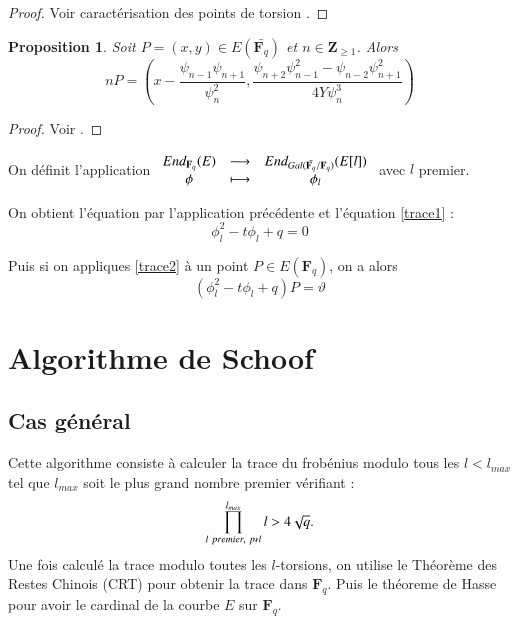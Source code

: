\documentclass{article}%
\theoremstyle{plain}
\theoremstyle{definition}
\theoremstyle{plain}
\newtheorem{proposition}{Proposition}[section]
\theoremstyle{plain}
\theoremstyle{remark}
\newcommand\fq{\mathbf{F}_{q}}
\begin{document}
\begin{proof}
Voir caractérisation des points de torsion \cite{ref4}. 
\end{proof}

\begin{proposition}
Soit $P=(x,y)\in E(\bar{\fq})$ et $n\in\mathbf{Z}_{\geq 1}$. Alors 
\begin{equation}
nP = \left(x - \dfrac{\psi_{n - 1}\psi_{n + 1}}{\psi_{n}^{2}},\dfrac{\psi_{n + 2}\psi_{n - 1}^{2} - \psi_{n - 2}\psi_{n + 1}^{2}}{4Y\psi_{n}^{3}}\right)
\label{np2}
\end{equation}
\end{proposition}

\begin{proof}
Voir \cite{ref6}.
\end{proof}
  
On définit l'application $
\begin{array}{cl cl}
End_{\fq}(E)&\longrightarrow&End_{Gal(\bar{\fq}/\fq)}(E[l])\\
\phi&\longmapsto&\phi_{l}
\end{array}
$ avec $l$ premier.

On obtient l'équation par l'application précédente et l'équation \eqref{trace1} :
\begin{equation}
\phi_{l}^{2} - t\phi_{l} + q = 0
\label{trace2}
\end{equation}

Puis si on appliques \eqref{trace2} à un point $P\in E(\fq)$, on a alors 
\begin{equation}
(\phi_{l}^{2} - t\phi_{l} + q)P = \vartheta
\label{trace3}
\end{equation}


\section{Algorithme de Schoof}
\subsection{Cas général}

Cette algorithme consiste à calculer la trace du frobénius modulo tous les $l<l_{max}$ tel que $l_{max}$ soit le plus grand nombre premier vérifiant :\begin{equation} 
\prod_{l\ premier,\ p\nshortmid l}^{l_{max}}l > 4\sqrt{q}.
\label{primorielle}
\end{equation}
Une fois calculé la trace modulo toutes les $l$-torsions, on utilise le Théorème des Restes Chinois (CRT) pour obtenir la trace dans $\fq$. Puis le théoreme de Hasse pour avoir le cardinal de la courbe $E$ sur $\fq$.
\end{document}
